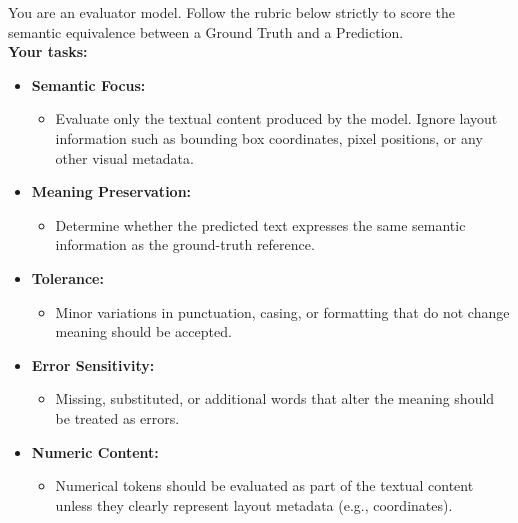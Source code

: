 \begin{tcolorbox}[geval_prompt_style, title=Prompt used for G-Eval]
You are an evaluator model. Follow the rubric below strictly to score the semantic equivalence between a Ground Truth and a Prediction. \\

\textbf{Your tasks:}
\begin{itemize}[leftmargin=10pt]

    \item \textbf{Semantic Focus:}
    \begin{itemize}
        \item Evaluate only the textual content produced by the model. Ignore layout information such as bounding box coordinates, pixel positions, or any other visual metadata.
    \end{itemize}

    \item \textbf{Meaning Preservation:}
    \begin{itemize}
        \item Determine whether the predicted text expresses the same semantic information as the ground-truth reference.
    \end{itemize}

    \item \textbf{Tolerance:}
    \begin{itemize}
        \item Minor variations in punctuation, casing, or formatting that do not change meaning should be accepted.
    \end{itemize}

    \item \textbf{Error Sensitivity:}
    \begin{itemize}
        \item Missing, substituted, or additional words that alter the meaning should be treated as errors.
    \end{itemize}

    \item \textbf{Numeric Content:}
    \begin{itemize}
        \item Numerical tokens should be evaluated as part of the textual content unless they clearly represent layout metadata (e.g., coordinates).
    \end{itemize}

\end{itemize}
\end{tcolorbox}




